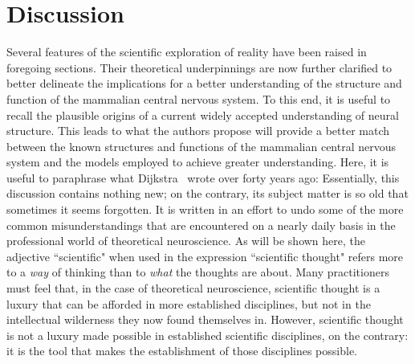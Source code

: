 \documentclass[10pt,letterpaper]{article}
\begin{document}



\section*{Discussion}

Several features of the scientific exploration of reality have been raised in foregoing sections. Their  theoretical underpinnings are now further clarified to better delineate the implications for a better understanding of the structure and function of the mammalian central nervous system. To this end, it is useful to recall the plausible origins of a current widely accepted understanding of neural structure. This leads to what the authors propose will provide a better match between the known structures and functions of the mammalian central nervous system and the models employed to achieve greater understanding. Here, it is useful to paraphrase what Dijkstra~\cite{Dijkstra:1982fu} wrote over forty years ago: Essentially, this discussion contains nothing new; on the contrary, its subject matter is so old that sometimes it seems forgotten. It is written in an effort to undo some of the more common misunderstandings that are encountered on a nearly daily basis in the professional world of theoretical neuroscience. As will be shown here, the adjective ``scientific" when used in the expression ``scientific thought" refers more to a {\it{way}} of thinking than to {\it{what}} the thoughts are about. Many practitioners must feel that, in the case of theoretical neuroscience, scientific thought is a luxury that can be afforded in more established disciplines, but not in the intellectual wilderness they now found themselves in. However, scientific thought is not a luxury made possible in established scientific disciplines, on the contrary: it is the tool that makes the establishment of those disciplines possible.
\end{document}
